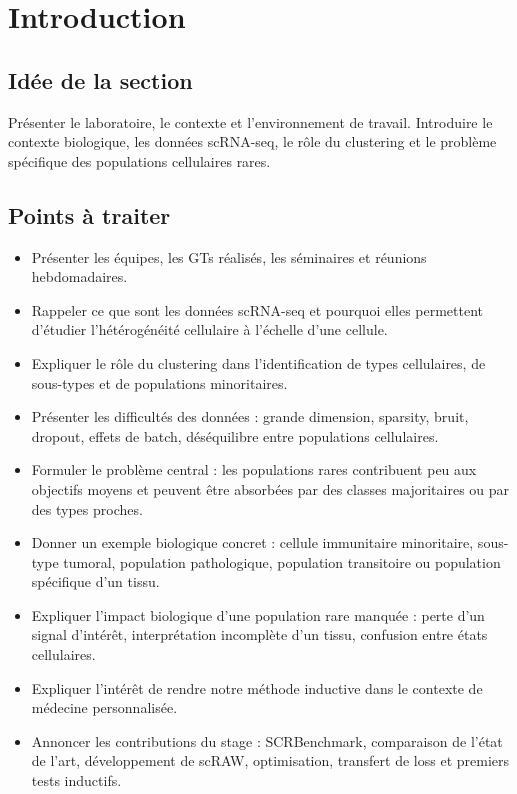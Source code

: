 
\section{Introduction}

\subsection*{Idée de la section }
Présenter le laboratoire, le contexte et l'environnement de travail. Introduire le contexte biologique, les données scRNA-seq, le rôle du clustering et le problème spécifique des populations cellulaires rares.

\subsection*{Points à traiter}
\begin{itemize}
  \item Présenter les équipes, les GTs réalisés, les séminaires et réunions hebdomadaires.
  \item Rappeler ce que sont les données scRNA-seq et pourquoi elles permettent d'étudier l'hétérogénéité cellulaire à l'échelle d'une cellule.
  \item Expliquer le rôle du clustering dans l'identification de types cellulaires, de sous-types et de populations minoritaires.
  \item Présenter les difficultés des données : grande dimension, sparsity, bruit, dropout, effets de batch, déséquilibre entre populations cellulaires.
  \item Formuler le problème central : les populations rares contribuent peu aux objectifs moyens et peuvent être absorbées par des classes majoritaires ou par des types proches.
  \item Donner un exemple biologique concret : cellule immunitaire minoritaire, sous-type tumoral, population pathologique, population transitoire ou population spécifique d'un tissu.
  \item Expliquer l'impact biologique d'une population rare manquée : perte d'un signal d'intérêt, interprétation incomplète d'un tissu, confusion entre états cellulaires.
  \item Expliquer l'intérêt de rendre notre méthode inductive dans le contexte de médecine personnalisée.
  \item Annoncer les contributions du stage : SCRBenchmark, comparaison de l'état de l'art, développement de scRAW, optimisation, transfert de loss et premiers tests inductifs.
\end{itemize}

